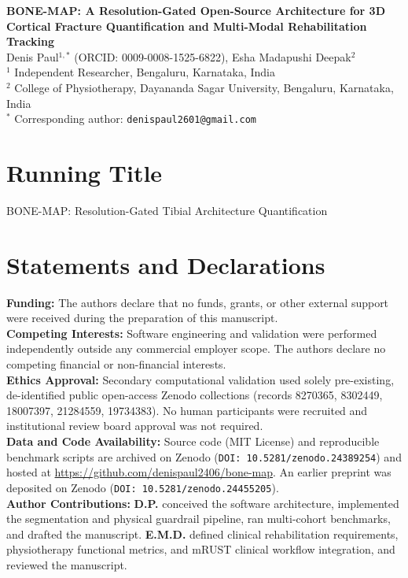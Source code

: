 \documentclass[11pt]{article}
\begin{document}
\begin{center}
{\Large\bfseries BONE-MAP: A Resolution-Gated Open-Source Architecture for 3D Cortical Fracture Quantification and Multi-Modal Rehabilitation Tracking}\\[1em]
{\large Denis Paul$^{1,*}$ (ORCID: 0009-0008-1525-6822), Esha Madapushi Deepak$^{2}$}\\[0.5em]
{\small $^{1}$ Independent Researcher, Bengaluru, Karnataka, India\\
$^{2}$ College of Physiotherapy, Dayananda Sagar University, Bengaluru, Karnataka, India\\
$^{*}$ Corresponding author: \texttt{denispaul2601@gmail.com}}
\end{center}

\section*{Running Title}
BONE-MAP: Resolution-Gated Tibial Architecture Quantification

\section*{Statements and Declarations}
\textbf{Funding:} The authors declare that no funds, grants, or other external support were received during the preparation of this manuscript.\\
\textbf{Competing Interests:} Software engineering and validation were performed independently outside any commercial employer scope. The authors declare no competing financial or non-financial interests.\\
\textbf{Ethics Approval:} Secondary computational validation used solely pre-existing, de-identified public open-access Zenodo collections (records 8270365, 8302449, 18007397, 21284559, 19734383). No human participants were recruited and institutional review board approval was not required.\\
\textbf{Data and Code Availability:} Source code (MIT License) and reproducible benchmark scripts are archived on Zenodo (\texttt{DOI: 10.5281/zenodo.24389254}) and hosted at \url{https://github.com/denispaul2406/bone-map}. An earlier preprint was deposited on Zenodo (\texttt{DOI: 10.5281/zenodo.24455205}).\\
\textbf{Author Contributions:} \textbf{D.P.} conceived the software architecture, implemented the segmentation and physical guardrail pipeline, ran multi-cohort benchmarks, and drafted the manuscript. \textbf{E.M.D.} defined clinical rehabilitation requirements, physiotherapy functional metrics, and mRUST clinical workflow integration, and reviewed the manuscript.
\end{document}
